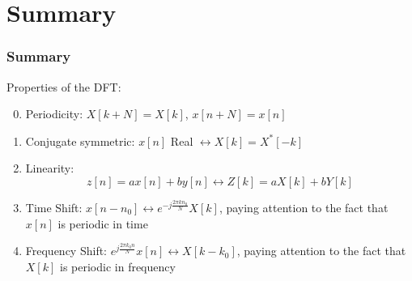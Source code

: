 \documentclass{beamer}
\begin{document}
\section[Summary]{Summary}
\setcounter{subsection}{1}

\begin{frame}
  \frametitle{Summary}

  Properties of the DFT:

  \begin{enumerate}
    \setcounter{enumi}{-1}
  \item Periodicity: $X[k+N]=X[k]$, $x[n+N]=x[n]$
  \item Conjugate symmetric: $x[n]$ Real $\leftrightarrow X[k]=X^*[-k]$
  \item Linearity:
    \[z[n]=ax[n]+by[n]\leftrightarrow Z[k]=aX[k]+bY[k]
    \]
  \item Time Shift: $x[n-n_0]\leftrightarrow e^{-j\frac{2\pi
      kn_0}{N}}X[k]$, paying attention to the fact that $x[n]$ is
    periodic in time
  \item Frequency Shift: $e^{j\frac{2\pi k_0 n}{N}}x[n]\leftrightarrow
    X[k-k_0]$, paying attention to the fact that $X[k]$ is periodic
    in frequency
  \end{enumerate}
\end{frame}
\end{document}
